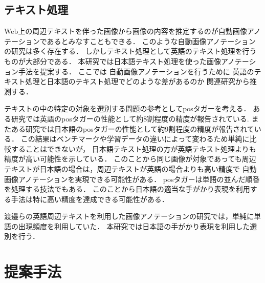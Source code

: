 \documentclass{deimj}
\begin{document}
\subsection{テキスト処理}

Web上の周辺テキストを伴った画像から画像の内容を推定するのが自動画像アノテーションであるとみなすこともできる．
このような自動画像アノテーションの研究は多く存在する．
しかしテキスト処理として英語のテキスト処理を行うものが大部分である．
本研究では日本語テキスト処理を使った画像アノテーション手法を提案する．
%
ここでは
自動画像アノテーションを行うために
英語のテキスト処理と日本語のテキスト処理でどのような差があるのか
関連研究から推測する．

テキストの中の特定の対象を選別する問題の参考としてposタガーを考える．
ある研究では英語のposタガーの性能として約8割程度の精度が報告されている\cite{BirdKleinLoper09}.
またある研究では日本語のposタガーの性能として約9割程度の精度が報告されている\cite{UniDicJp2010}．
この結果はベンチマークや学習データの違いによって変わるため単純に比較することはできないが，
日本語テキスト処理の方が英語テキスト処理よりも精度が高い可能性を示している．
このことから同じ画像が対象であっても周辺テキストが日本語の場合は，周辺テキストが英語の場合よりも高い精度で
自動画像アノテーションを実現できる可能性がある．
posタガーは単語の並んだ順番を処理する技法でもある．
このことから日本語の適当な手がかり表現を利用する手法は特に高い精度を達成できる可能性がある．

渡邉ら\cite{watanabe}の英語周辺テキストを利用した画像アノテーションの研究では，単純に単語の出現頻度を利用していた．
本研究では日本語の手がかり表現を利用した選別を行う．

\section{提案手法}
\label{sec:way}
\end{document}
